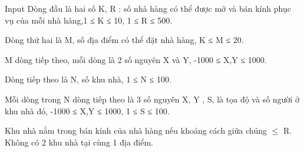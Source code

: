 Input
Dòng đầu là hai số K, R : số nhà hàng có thể được mở và bán kính phục vụ của mỗi nhà hàng,1 ≤ K ≤ 10, 1 ≤ R ≤ 500.  

   Dòng thứ hai là M, số địa điểm có thể đặt nhà hàng, K ≤ M ≤ 20.  

   M dòng tiếp theo, mỗi dòng là 2 số nguyên X và Y, -1000 ≤ X,Y ≤ 1000.  

   Dòng tiếp theo là N, số khu nhà, 1 ≤ N ≤ 100.  

   Mỗi dòng trong N dòng tiếp theo là 3 số nguyên  X, Y , S,  là tọa độ và số người ở khu nhà đó, -1000 ≤ X,Y ≤ 1000, 1 ≤ S ≤ 100.  

   Khu nhà nằm trong bán kính của nhà hàng nếu khoảng cách giữa chúng  $\le$  R. Không có 2 khu nhà tại cùng 1 địa điểm.